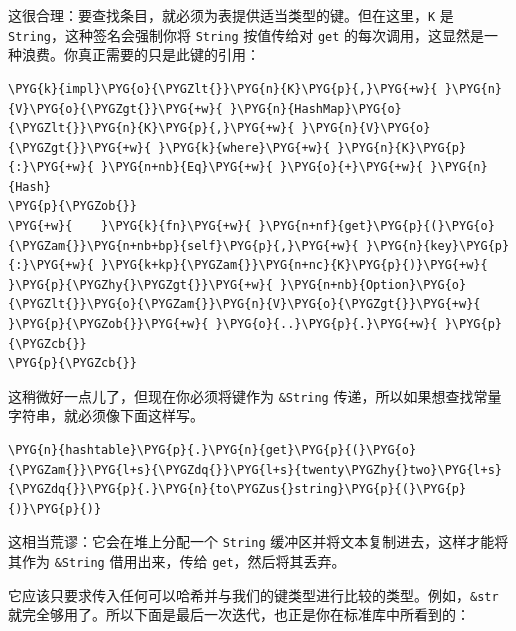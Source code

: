 这很合理：要查找条目，就必须为表提供适当类型的键。但在这里，\texttt{K} 是 \texttt{String}，这种签名会强制你将 \texttt{String} 按值传给对 \texttt{get} 的每次调用，这显然是一种浪费。你真正需要的只是此键的引用：

\begin{Verbatim}[commandchars=\\\{\},breaklines=true,breakanywhere=true,fontsize=\codefont,xleftmargin=17bp]
\PYG{k}{impl}\PYG{o}{\PYGZlt{}}\PYG{n}{K}\PYG{p}{,}\PYG{+w}{ }\PYG{n}{V}\PYG{o}{\PYGZgt{}}\PYG{+w}{ }\PYG{n}{HashMap}\PYG{o}{\PYGZlt{}}\PYG{n}{K}\PYG{p}{,}\PYG{+w}{ }\PYG{n}{V}\PYG{o}{\PYGZgt{}}\PYG{+w}{ }\PYG{k}{where}\PYG{+w}{ }\PYG{n}{K}\PYG{p}{:}\PYG{+w}{ }\PYG{n+nb}{Eq}\PYG{+w}{ }\PYG{o}{+}\PYG{+w}{ }\PYG{n}{Hash}
\PYG{p}{\PYGZob{}}
\PYG{+w}{    }\PYG{k}{fn}\PYG{+w}{ }\PYG{n+nf}{get}\PYG{p}{(}\PYG{o}{\PYGZam{}}\PYG{n+nb+bp}{self}\PYG{p}{,}\PYG{+w}{ }\PYG{n}{key}\PYG{p}{:}\PYG{+w}{ }\PYG{k+kp}{\PYGZam{}}\PYG{n+nc}{K}\PYG{p}{)}\PYG{+w}{ }\PYG{p}{\PYGZhy{}\PYGZgt{}}\PYG{+w}{ }\PYG{n+nb}{Option}\PYG{o}{\PYGZlt{}}\PYG{o}{\PYGZam{}}\PYG{n}{V}\PYG{o}{\PYGZgt{}}\PYG{+w}{ }\PYG{p}{\PYGZob{}}\PYG{+w}{ }\PYG{o}{..}\PYG{p}{.}\PYG{+w}{ }\PYG{p}{\PYGZcb{}}
\PYG{p}{\PYGZcb{}}
\end{Verbatim}

这稍微好一点儿了，但现在你必须将键作为 \texttt{\&String} 传递，所以如果想查找常量字符串，就必须像下面这样写。

\begin{Verbatim}[commandchars=\\\{\},breaklines=true,breakanywhere=true,fontsize=\codefont,xleftmargin=17bp]
\PYG{n}{hashtable}\PYG{p}{.}\PYG{n}{get}\PYG{p}{(}\PYG{o}{\PYGZam{}}\PYG{l+s}{\PYGZdq{}}\PYG{l+s}{twenty\PYGZhy{}two}\PYG{l+s}{\PYGZdq{}}\PYG{p}{.}\PYG{n}{to\PYGZus{}string}\PYG{p}{(}\PYG{p}{)}\PYG{p}{)}
\end{Verbatim}

这相当荒谬：它会在堆上分配一个 \texttt{String} 缓冲区并将文本复制进去，这样才能将其作为 \texttt{\&String} 借用出来，传给 \texttt{get}，然后将其丢弃。

它应该只要求传入任何可以哈希并与我们的键类型进行比较的类型。例如，\texttt{\&str} 就完全够用了。所以下面是最后一次迭代，也正是你在标准库中所看到的：

